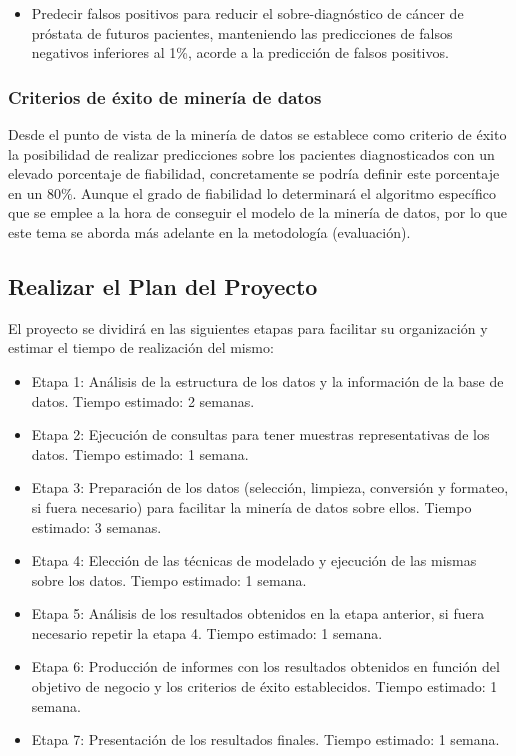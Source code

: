 \documentclass{article}
\begin{document}
\begin{itemize}
	\item Predecir falsos positivos para reducir el sobre-diagnóstico de cáncer de próstata de futuros pacientes, manteniendo las predicciones de falsos negativos inferiores al 1\%, acorde a la predicción de falsos positivos.
\end{itemize}

\subsubsection{Criterios de éxito de minería de datos}
Desde el punto de vista de la minería de datos se establece como criterio de éxito la posibilidad de realizar predicciones sobre los pacientes diagnosticados con un elevado porcentaje de fiabilidad, concretamente se podría definir este porcentaje en un 80\%. Aunque el grado de fiabilidad lo determinará el algoritmo específico que se emplee a la hora de conseguir el modelo de la minería de datos, por lo que este tema se aborda más adelante en la metodología (evaluación).

\subsection{Realizar el Plan del Proyecto}
El proyecto se dividirá en las siguientes etapas para facilitar su organización y estimar el tiempo de realización del mismo:

\begin{itemize}
	\item Etapa 1: Análisis de la estructura de los datos y la información de la base de datos. Tiempo estimado: 2 semanas.
	\item Etapa 2: Ejecución de consultas para tener muestras representativas de los datos. Tiempo estimado: 1 semana.
	\item Etapa 3: Preparación de los datos (selección, limpieza, conversión y formateo, si fuera necesario) para facilitar la minería de datos sobre ellos. Tiempo estimado: 3 semanas.
	\item Etapa 4: Elección de las técnicas de modelado y ejecución de las mismas sobre los datos. Tiempo estimado: 1 semana.
	\item Etapa 5: Análisis de los resultados obtenidos en la etapa anterior, si fuera necesario repetir la etapa 4. Tiempo estimado: 1 semana.
	\item Etapa 6: Producción de informes con los resultados obtenidos en función del objetivo de negocio y los criterios de éxito establecidos. Tiempo estimado: 1 semana.
	\item Etapa 7: Presentación de los resultados finales. Tiempo estimado: 1 semana.
\end{itemize}
\end{document}
